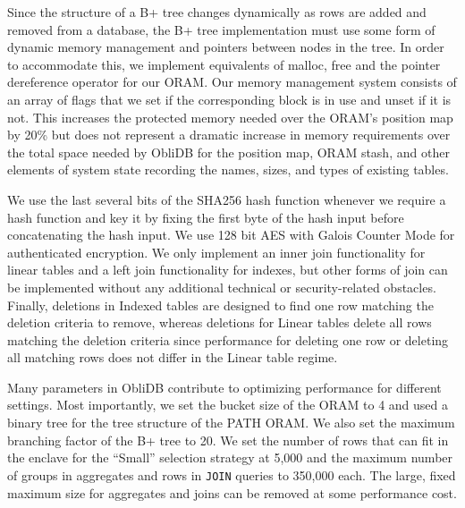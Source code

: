 \documentclass[letterpaper,twocolumn,10pt]{article}
\def\name/{ObliDB}
\begin{document}
Since the structure of a B+ tree changes dynamically as rows are added and removed from a database, the B+ tree implementation must use some form of dynamic memory management and pointers between nodes in the tree. In order to accommodate this, we implement equivalents of malloc, free and the pointer dereference operator for our ORAM. Our memory management system consists of an array of flags that we set if the corresponding block is in use and unset if it is not. This increases the protected memory needed over the ORAM's position map by 20\% but does not represent a dramatic increase in memory requirements over the total space needed by \name/ for the position map, ORAM stash, and other elements of system state recording the names, sizes, and types of existing tables. 

We use the last several bits of the SHA256 hash function whenever we require a hash function and key it by fixing the first byte of the hash input before concatenating the hash input. We use 128 bit AES with Galois Counter Mode for authenticated encryption. We only implement an inner join functionality for linear tables and a left join functionality for indexes, but other forms of join can be implemented without any additional technical or security-related obstacles. Finally, deletions in Indexed tables are designed to find one row matching the deletion criteria to remove, whereas deletions for Linear tables delete all rows matching the deletion criteria since performance for deleting one row or deleting all matching rows does not differ in the Linear table regime.

Many parameters in \name/ contribute to optimizing performance for different settings. Most importantly, we set the bucket size of the ORAM to 4 and used a binary tree for the tree structure of the PATH ORAM. We also set the maximum branching factor of the B+ tree to 20. We set the number of rows that can fit in the enclave for the ``Small'' selection strategy at 5,000 and the maximum number of groups in aggregates and rows in \texttt{JOIN} queries to 350,000 each. The large, fixed maximum size for aggregates and joins can be removed at some performance cost. 
\end{document}
